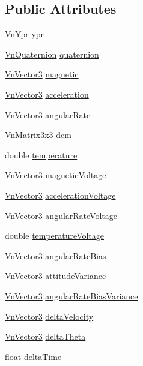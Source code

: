 \subsection*{Public Attributes}
\begin{DoxyCompactItemize}
\item 
\hyperlink{structVnYpr}{Vn\+Ypr} \hyperlink{structVn100CompositeData_ada2b1cd61b346de5f3ecadb7a0a7b864}{ypr}
\item 
\hyperlink{structVnQuaternion}{Vn\+Quaternion} \hyperlink{structVn100CompositeData_aa46f1550ab05e5a3fa8f3eefb2dce463}{quaternion}
\item 
\hyperlink{structVnVector3}{Vn\+Vector3} \hyperlink{structVn100CompositeData_a40eeccb4b8194922dff2c7d634475c55}{magnetic}
\item 
\hyperlink{structVnVector3}{Vn\+Vector3} \hyperlink{structVn100CompositeData_a3f4694adc6d229f9381e7dc3a8350e57}{acceleration}
\item 
\hyperlink{structVnVector3}{Vn\+Vector3} \hyperlink{structVn100CompositeData_a48701e60838a8d019d79b59a3019ded0}{angular\+Rate}
\item 
\hyperlink{structVnMatrix3x3}{Vn\+Matrix3x3} \hyperlink{structVn100CompositeData_a35772621c6640afae0c7704e741af99d}{dcm}
\item 
double \hyperlink{structVn100CompositeData_aacb5b98b462ae3e4889bd4ea0b59935b}{temperature}
\item 
\hyperlink{structVnVector3}{Vn\+Vector3} \hyperlink{structVn100CompositeData_a7daa9e416535dcc148b328d6d46c1d03}{magnetic\+Voltage}
\item 
\hyperlink{structVnVector3}{Vn\+Vector3} \hyperlink{structVn100CompositeData_af1ea7e2c27d06a5d30cf662c807b3c12}{acceleration\+Voltage}
\item 
\hyperlink{structVnVector3}{Vn\+Vector3} \hyperlink{structVn100CompositeData_afc2351d2854bf2ff0711bc4b939d0d8b}{angular\+Rate\+Voltage}
\item 
double \hyperlink{structVn100CompositeData_a6084ecf97f8cde0fcba7a346a3bb1ab6}{temperature\+Voltage}
\item 
\hyperlink{structVnVector3}{Vn\+Vector3} \hyperlink{structVn100CompositeData_a5c173cdabde185645cf09a46e63b6956}{angular\+Rate\+Bias}
\item 
\hyperlink{structVnVector3}{Vn\+Vector3} \hyperlink{structVn100CompositeData_a582aa6c6eb2a97ec5f245e4f6b792b0e}{attitude\+Variance}
\item 
\hyperlink{structVnVector3}{Vn\+Vector3} \hyperlink{structVn100CompositeData_ae93b1ddac5649602fc7623d8f9437d32}{angular\+Rate\+Bias\+Variance}
\item 
\hyperlink{structVnVector3}{Vn\+Vector3} \hyperlink{structVn100CompositeData_a643c7c513736a83810289df4606130f6}{delta\+Velocity}
\item 
\hyperlink{structVnVector3}{Vn\+Vector3} \hyperlink{structVn100CompositeData_a203e6abd35fb2d47d20f34b628796748}{delta\+Theta}
\item 
float \hyperlink{structVn100CompositeData_a9bd6636ec81374d0eab6b5f460a1a2c9}{delta\+Time}
\end{DoxyCompactItemize}


